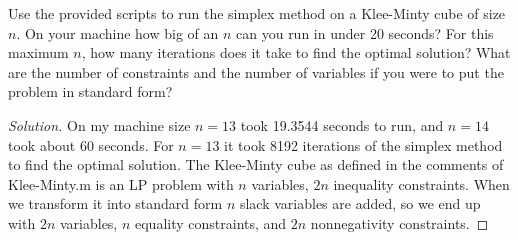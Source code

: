 \documentclass[12pt]{article}
\makeatletter
\theoremstyle{homework}
\newenvironment{exercise}[1]
{\def\@currentlabel{#1}\exercisecore}
{\endexercisecore}
\makeatother
\begin{document}
\begin{exercise}{Problem P11} Use the provided scripts to run the simplex method on a Klee-Minty cube of size $n$.
  On your machine how big of an $n$ can you run in under 20 seconds? For this maximum $n$, how many iterations does it take to find the optimal 
  solution? What are the number of constraints and the number of variables if you were to put the problem in standard form?
  \begin{proof}[Solution] On my machine size $n = 13$ took 19.3544 seconds to run, and $n = 14$ took about 60 seconds. 
    For $n = 13$ it took 8192 iterations of the simplex method to find the optimal solution. The Klee-Minty cube as defined in the 
    comments of Klee-Minty.m is an LP problem with $n$ variables, $2n$ inequality constraints. When we transform it into standard form 
    $n$ slack variables are added, so we end up with $2n$ variables, $n$ equality constraints, and $2n$ nonnegativity constraints. 
  \end{proof}
  
\end{exercise}
\end{document}
